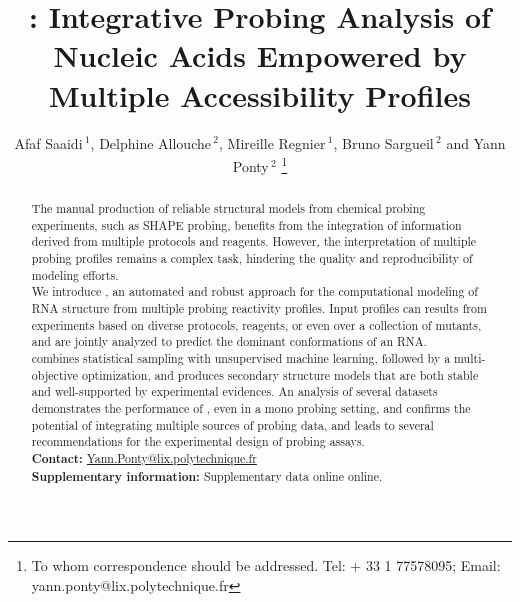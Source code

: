 \documentclass[a4,center,fleqn]{NAR}
\newcommand{\Software}[1]{\text{\ttfamily\bfseries #1}}
\newcommand{\OurTool}{\Software{IPANEMAP}\xspace}
\begin{document}
\title{\OurTool{}:  Integrative Probing Analysis of Nucleic Acids Empowered by Multiple Accessibility Profiles}
\author{%
Afaf Saaidi\,$^{1}$,
Delphine Allouche\,$^{2}$,
Mireille Regnier\,$^{1}$,
Bruno Sargueil\,$^{2}$
and Yann Ponty\,$^2$%
\footnote{To whom correspondence should be addressed.
Tel: + 33 1 77578095; Email: yann.ponty@lix.polytechnique.fr}}


\address{%
$^{1}$CNRS UMR 7161, LIX, Ecole Polytechnique, France
and
$^{2}$CNRS UMR 8015, Laboratoire de cristallographie et RMN Biologiques, University Paris Descartes, France}


\maketitle

\begin{abstract}
The manual production of reliable structural models from chemical probing experiments, such as SHAPE probing, benefits from the integration of information derived from multiple protocols and reagents. However, the interpretation of multiple probing profiles remains a complex task, hindering the quality and reproducibility of modeling efforts.\\
We introduce \OurTool{}, an automated and robust approach for the computational modeling of RNA structure from multiple probing reactivity profiles. Input profiles can results from experiments based on diverse protocols, reagents, or even over a collection of mutants, and are jointly analyzed to predict the dominant conformations of an RNA.\\
\OurTool{} combines statistical sampling with unsupervised machine learning, followed by a multi-objective optimization, and produces secondary structure models that are both stable and well-supported by experimental evidences. An analysis of several datasets demonstrates the performance of \OurTool, even in a mono probing setting, and confirms the potential of integrating multiple sources of probing data, and leads to several recommendations for the experimental design of probing assays. 
\\
\textbf{Contact:} \href{yann.ponty@lix.polytechnique.fr}{Yann.Ponty@lix.polytechnique.fr}\\
\textbf{Supplementary information:} Supplementary data online
online.
\end{abstract}
\end{document}
